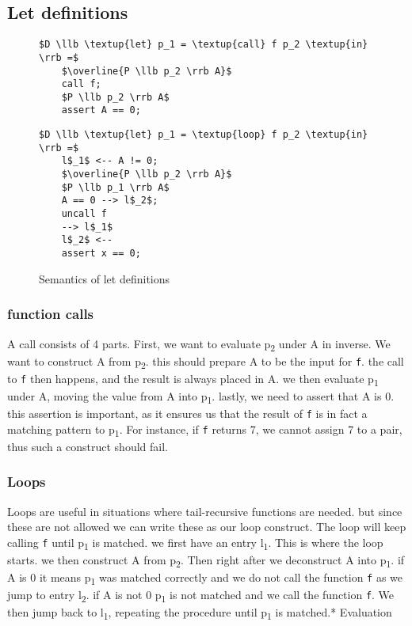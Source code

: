 \documentclass[a4paper]{article}
\begin{document}
\subsection{Let definitions}
\label{sec:org2642d81}
\begin{figure}[!htb]
\begin{minipage}{0.4\textwidth}
\begin{lstlisting}
$D \llb \textup{let} p_1 = \textup{call} f p_2 \textup{in} \rrb =$
    $\overline{P \llb p_2 \rrb A}$
    call f;
    $P \llb p_2 \rrb A$
    assert A == 0;
\end{lstlisting}
\end{minipage}
\qquad
\begin{minipage}{0.4\textwidth}
\begin{lstlisting}
$D \llb \textup{let} p_1 = \textup{loop} f p_2 \textup{in} \rrb =$
    l$_1$ <-- A != 0;
    $\overline{P \llb p_2 \rrb A}$
    $P \llb p_1 \rrb A$
    A == 0 --> l$_2$;
    uncall f
    --> l$_1$
    l$_2$ <--
    assert x == 0;
\end{lstlisting}
\end{minipage}

\caption{Semantics of let definitions}
\label{defs}
\end{figure}
\subsubsection{function calls}
\label{sec:org951b0ba}
A call consists of 4 parts. First, we want to evaluate p\textsubscript{2} under A in inverse. We want to construct A from p\textsubscript{2}. this should prepare A to be the input for \texttt{f}. the call to \texttt{f} then happens, and the result is always placed in A. we then evaluate p\textsubscript{1} under A, moving the value from A into p\textsubscript{1}. lastly, we need to assert that A is 0. this assertion is important, as it ensures us that the result of \texttt{f} is in fact a matching pattern to p\textsubscript{1}. For instance, if \texttt{f} returns 7, we cannot assign 7 to a pair, thus such a construct should fail.
\subsubsection{Loops}
\label{sec:orgd219309}
Loops are useful in situations where tail-recursive functions are needed. but since these are not allowed we can write these as our loop construct. The loop will keep calling \texttt{f} until p\textsubscript{1} is matched. we first have an entry l\textsubscript{1}. This is where the loop starts. we then construct A from p\textsubscript{2}. Then right after we deconstruct A into p\textsubscript{1}. if A is 0 it means p\textsubscript{1} was matched correctly and we do not call the function \texttt{f} as we jump to entry l\textsubscript{2}. if A is not 0 p\textsubscript{1} is not matched and we call the function \texttt{f}. We then jump back to l\textsubscript{1}, repeating the procedure until p\textsubscript{1} is matched.* Evaluation
\end{document}
